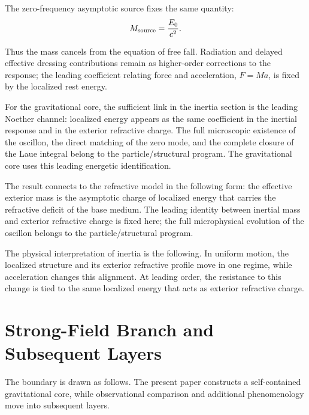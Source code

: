 \documentclass[12pt]{article}
\begin{document}
The zero-frequency asymptotic source fixes the same quantity:
\begin{equation}
M_{\rm source}=\frac{E_0}{c^2}.
\end{equation}

Thus the mass cancels from the equation of free fall. Radiation and delayed effective dressing contributions remain as higher-order corrections to the response; the leading coefficient relating force and acceleration, $F=Ma$, is fixed by the localized rest energy.

For the gravitational core, the sufficient link in the inertia section is the leading Noether channel: localized energy appears as the same coefficient in the inertial response and in the exterior refractive charge. The full microscopic existence of the oscillon, the direct matching of the zero mode, and the complete closure of the Laue integral belong to the particle/structural program. The gravitational core uses this leading energetic identification.

The result connects to the refractive model in the following form: the effective exterior mass is the asymptotic charge of localized energy that carries the refractive deficit of the base medium. The leading identity between inertial mass and exterior refractive charge is fixed here; the full microphysical evolution of the oscillon belongs to the particle/structural program.

The physical interpretation of inertia is the following. In uniform motion, the localized structure and its exterior refractive profile move in one regime, while acceleration changes this alignment. At leading order, the resistance to this change is tied to the same localized energy that acts as exterior refractive charge.

\section{Strong-Field Branch and Subsequent Layers}
\label{sec:strong-field}

The boundary is drawn as follows. The present paper constructs a self-contained gravitational core, while observational comparison and additional phenomenology move into subsequent layers.
\end{document}
